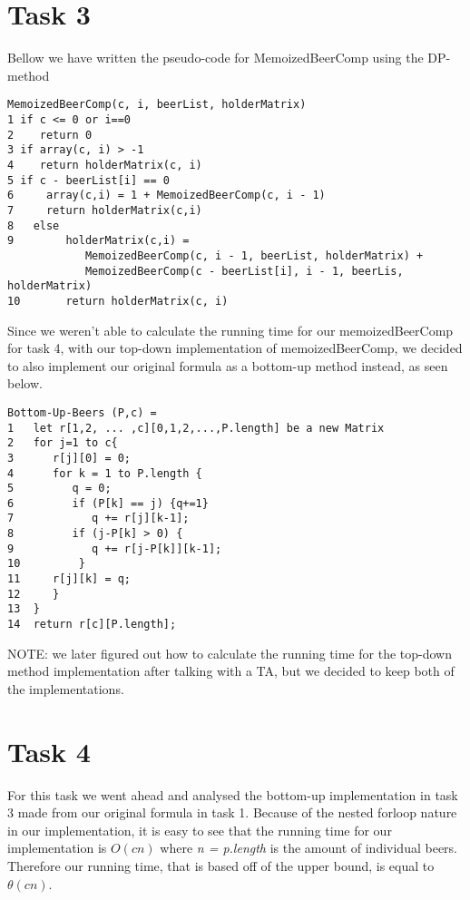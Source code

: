 \documentclass[12pt]{article}
\begin{document}
\section{Task 3}
Bellow we have written the pseudo-code for MemoizedBeerComp using the DP-method\\
\begin{verbatim}
MemoizedBeerComp(c, i, beerList, holderMatrix)
1 if c <= 0 or i==0
2    return 0
3 if array(c, i) > -1
4    return holderMatrix(c, i)
5 if c - beerList[i] == 0
6     array(c,i) = 1 + MemoizedBeerComp(c, i - 1)
7     return holderMatrix(c,i)
8   else
9        holderMatrix(c,i) =
            MemoizedBeerComp(c, i - 1, beerList, holderMatrix) +
            MemoizedBeerComp(c - beerList[i], i - 1, beerLis, holderMatrix)
10       return holderMatrix(c, i)
\end{verbatim}
Since we weren't able to calculate the running time for our memoizedBeerComp for task 4, with our top-down implementation of memoizedBeerComp, we decided to also implement our original formula as a bottom-up method instead, as seen below.
\begin{verbatim}
Bottom-Up-Beers (P,c) = 
1   let r[1,2, ... ,c][0,1,2,...,P.length] be a new Matrix
2   for j=1 to c{
3      r[j][0] = 0;
4      for k = 1 to P.length {
5         q = 0; 
6         if (P[k] == j) {q+=1}
7            q += r[j][k-1];
8         if (j-P[k] > 0) {
9            q += r[j-P[k]][k-1];
10         }
11     r[j][k] = q;	
12     }
13  }
14	return r[c][P.length];
\end{verbatim}
NOTE: we later figured out how to calculate the running time for the top-down method implementation after talking with a TA, but we decided to keep both of the implementations.
\section{Task 4}
For this task we went ahead and analysed the bottom-up implementation in task 3 made from our original formula in task 1. Because of the nested forloop nature in our implementation, it is easy to see that the running time for our implementation is $O(cn)$ where \textit{n = p.length} is the amount of individual beers. Therefore our running time, that is based off of the upper bound, is equal to $\theta(cn)$.




\end{document}

